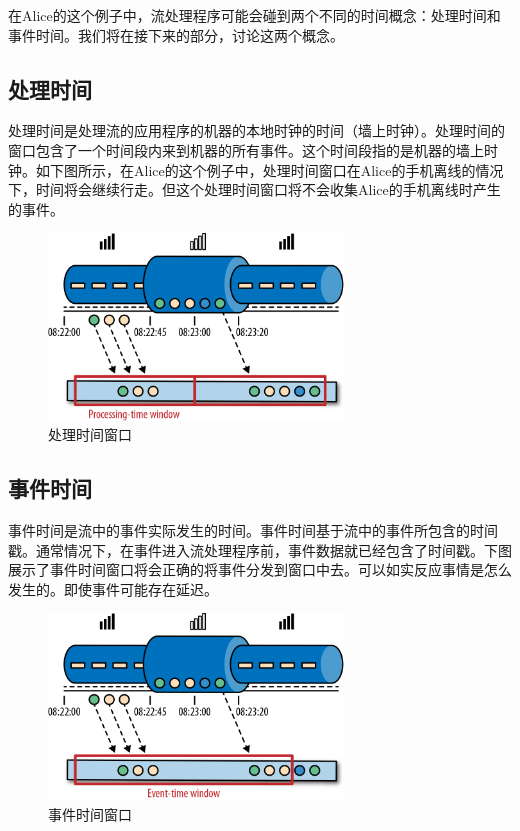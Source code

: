 \documentclass[cn,11pt,chinese]{elegantbook}
\begin{document}
在Alice的这个例子中，流处理程序可能会碰到两个不同的时间概念：处理时间和事件时间。我们将在接下来的部分，讨论这两个概念。

\subsection{处理时间}

处理时间是处理流的应用程序的机器的本地时钟的时间（墙上时钟）。处理时间的窗口包含了一个时间段内来到机器的所有事件。这个时间段指的是机器的墙上时钟。如下图所示，在Alice的这个例子中，处理时间窗口在Alice的手机离线的情况下，时间将会继续行走。但这个处理时间窗口将不会收集Alice的手机离线时产生的事件。

\begin{figure}[htbp]
    \centering
    \includegraphics[width=0.7\textwidth]{images/spaf_0212.png}
    \caption{处理时间窗口}
\end{figure}

\subsection{事件时间}

事件时间是流中的事件实际发生的时间。事件时间基于流中的事件所包含的时间戳。通常情况下，在事件进入流处理程序前，事件数据就已经包含了时间戳。下图展示了事件时间窗口将会正确的将事件分发到窗口中去。可以如实反应事情是怎么发生的。即使事件可能存在延迟。

\begin{figure}[htbp]
    \centering
    \includegraphics[width=0.7\textwidth]{images/spaf_0213.png}
    \caption{事件时间窗口}
\end{figure}
\end{document}
